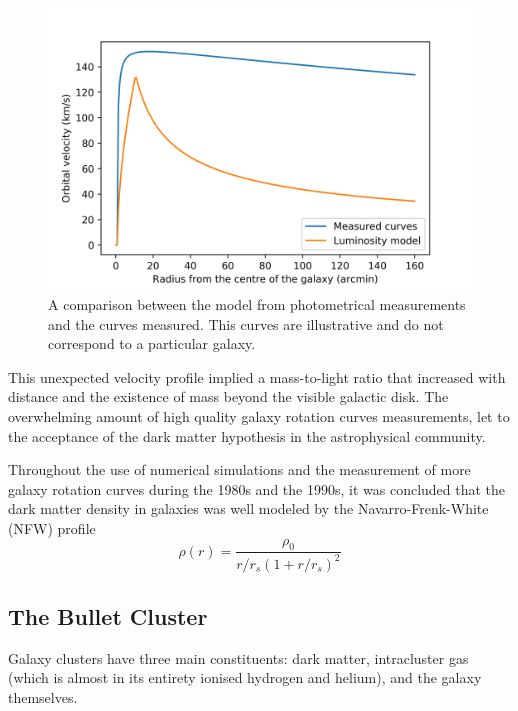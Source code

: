 \begin{figure}[H]
    \centering
    \includegraphics[scale=0.8]{imag/galaxyRotCurv.png}
    \caption{A comparison between the model from photometrical measurements and the curves measured. This curves are illustrative and do not correspond to a particular galaxy.}
    \label{galaxyCurve}
\end{figure}

This unexpected velocity profile implied a mass-to-light ratio that increased with distance and the existence of mass beyond the visible galactic disk\cite{theIsMassOutside}.
The overwhelming amount of high quality galaxy rotation curves measurements, let to the acceptance of the dark matter hypothesis in the astrophysical community.

Throughout the use of numerical simulations and the measurement of more galaxy rotation curves during the 1980s and the 1990s, it was concluded that the dark matter density in galaxies was well modeled by the Navarro-Frenk-White (NFW) profile\cite{FWN}\cite{mariangela}\\
\begin{equation}
\rho(r) = \frac{\rho_0}{r/r_s(1+r/r_s)^2}
\end{equation}


\subsection{The Bullet Cluster}
Galaxy clusters have three main constituents: dark matter, intracluster gas (which is almost in its entirety ionised hydrogen and helium), and the galaxy themselves.\cite{book:75345}



